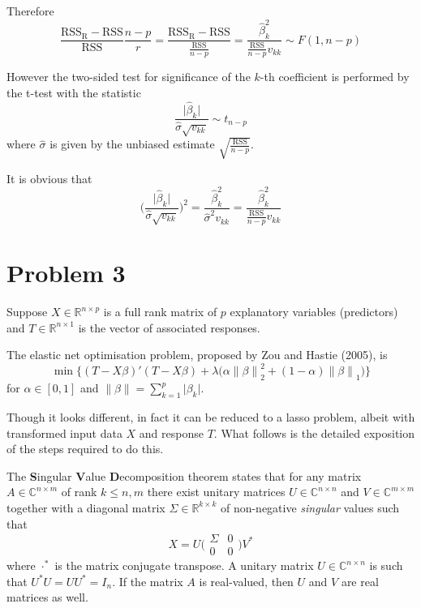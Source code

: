 \documentclass[a4paper]{article}
\newcommand{\nrm}[1]{{\left\| #1 \right \|}}
\newcommand{\R}{\text{R}}
\newcommand{\Real}{\mathbb{R}}
\newcommand{\Cplx}{\mathbb{C}}
\newcommand{\RSS}{\text{RSS}}
\begin{document}
Therefore 
\[ \frac{\RSS_\R - \RSS}{\RSS}\frac{n-p}{r} = \frac{\RSS_\R - \RSS}{\frac{\RSS}{n-p}} = \frac{\hat{\beta}_k^2}{\frac{\RSS}{n-p}v_{kk}} \sim F(1,n-p)\]

However the two-sided test for significance of the $k$-th coefficient is performed by the t-test with the statistic
\[\frac{\lvert \hat{\beta}_k \rvert}{\hat{\sigma}\sqrt{v_{kk}}}\sim t_{n-p}\] where $\hat{\sigma}$ is given by the unbiased estimate $\sqrt{\frac{\RSS}{n-p}}$.

It is obvious that 
\[\bigg(\frac{\lvert \hat{\beta}_k \rvert}{\hat{\sigma}\sqrt{v_{kk}}}\bigg)^2 = \frac{\hat{\beta}_k^2}{\hat{\sigma}^2 v_{kk}} = \frac{\hat{\beta}_k^2}{\frac{\RSS}{n-p} v_{kk}} \]

\clearpage

\section{Problem 3} %
\label{sec:problem_3}

Suppose $X\in \Real^{n\times p}$ is a full rank matrix of $p$ explanatory
variables (predictors) and $T\in \Real^{n\times 1}$ is the vector of
associated responses.

The elastic net optimisation problem, proposed by Zou and Hastie (2005), is
\[\min \Big\{ (T-X\beta)'(T-X\beta) + \lambda\big( \alpha \nrm{\beta}_2^2 + (1-\alpha) \nrm{\beta}_1 \big) \Big\}\]
for $\alpha\in [0,1]$ and $\nrm{\beta} = \sum_{k=1}^p \lvert \beta_k\rvert$.

Though it looks different, in fact it can be reduced to a lasso problem, albeit with transformed input data $X$ and response $T$. What follows is the detailed exposition of the steps required to do this.

The \textbf{S}ingular \textbf{V}alue \textbf{D}ecomposition theorem states
that for any matrix $A\in \Cplx^{n\times m}$ of rank $k\leq n,m$ there exist
unitary matrices $U\in \Cplx^{n\times n}$ and $V\in\Cplx^{m\times m}$
together with a diagonal matrix $\Sigma\in \Real^{k\times k}$ of non-negative
\emph{singular} values such that
\[X = U \Big(\begin{smallmatrix}\Sigma & 0 \\ 0 & 0\end{smallmatrix}\Big)V^*\]
where $\cdot^*$ is the matrix conjugate transpose. A unitary matrix
$U\in \Cplx^{n\times n}$ is such that $U^*U = UU^* = I_n$. If the matrix $A$ is real-valued, then $U$ and $V$ are real matrices as well.
\end{document}
